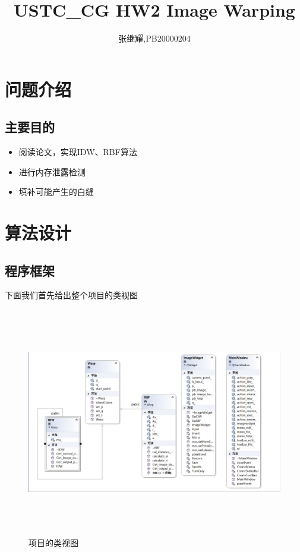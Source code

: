 \documentclass{article}
\title{USTC\_CG HW2 Image Warping}
\author{张继耀,PB20000204}
\begin{document}
	\maketitle
	
	\tableofcontents
	
	\section {问题介绍}
	\subsection{主要目的}
	
	\begin{itemize}
		\item 阅读论文，实现IDW、RBF算法
	\end{itemize}

	\begin{itemize}
		\item 进行内存泄露检测
	\end{itemize}

	\begin{itemize}
		\item 填补可能产生的白缝
	\end{itemize}

	
	\section{算法设计}
	
	\subsection{程序框架}
	
	下面我们首先给出整个项目的类视图
	
		\begin{figure}[H]
		\begin{center}
			
			\includegraphics[width=18cm,height=10cm]{Class}
			
			\caption{项目的类视图} \label{Class.label}
		\end{center}
	\end{figure}
\end{document}
